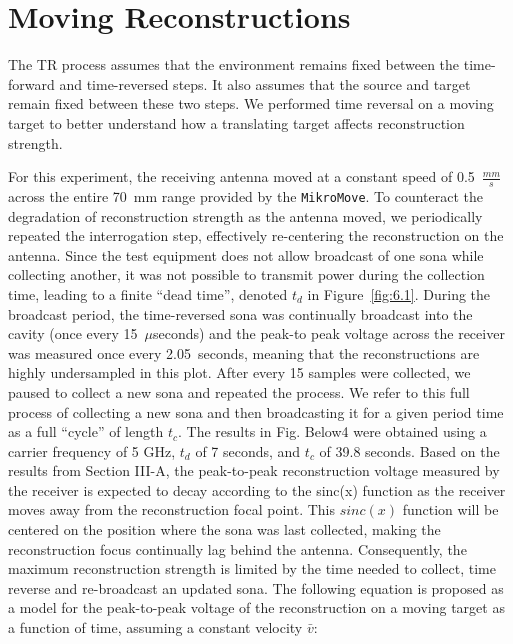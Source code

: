 \chapter{Moving Reconstructions}

\label{ch:moving}

The TR process assumes that the environment remains fixed between the time-forward and time-reversed steps. It also assumes that the source and target remain fixed between these two steps. We performed time reversal on a moving target to better understand how a translating target affects reconstruction strength.

For this experiment, the receiving antenna moved at a constant speed of 0.5~$\frac{mm}{s}$ across the entire 70~mm range provided by the \texttt{MikroMove}. To counteract the degradation of reconstruction strength as the antenna moved, we periodically repeated the interrogation step, effectively re-centering the reconstruction on the antenna. Since the test equipment does not allow broadcast of one sona while collecting another, it was not possible to transmit power during the collection time, leading to a finite ``dead time'', denoted $t_d$ in Figure~\ref{fig:6.1}. During the broadcast period, the time-reversed sona was continually broadcast into the cavity (once every 15~$\mu$seconds) and the peak-to peak voltage across the receiver was measured once every 2.05~seconds, meaning that the reconstructions are highly undersampled in this plot. After every 15 samples were collected, we paused to collect a new sona and repeated the process. We refer to this full process of collecting a new sona and then broadcasting it for a given period time as a full ``cycle'' of length $t_c$. The results in Fig. {Below}4 were obtained using a carrier frequency of 5 GHz, $t_d$ of 7 seconds, and $t_c$ of 39.8 seconds. Based on the results from Section III-A, the peak-to-peak reconstruction voltage measured by the receiver is expected to decay according to the sinc(x) function as the receiver
moves away from the reconstruction focal point. This $sinc(x)$ function will be centered on the position where the sona was last collected, making the reconstruction focus continually lag behind the antenna. Consequently, the maximum reconstruction strength is limited by the time needed to collect, time reverse and re-broadcast an updated sona. The following equation is proposed as a model for the peak-to-peak voltage of the reconstruction on a moving target as a
function of time, assuming a constant velocity $\bar{v}$:

